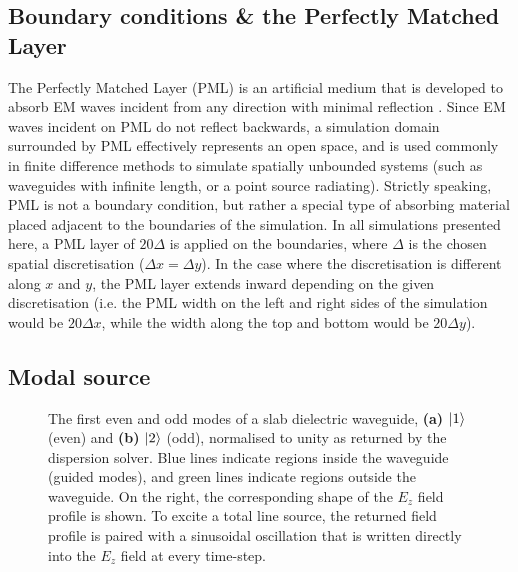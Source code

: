 \subsection{Boundary conditions \& the Perfectly Matched Layer}
The Perfectly Matched Layer (PML) is an artificial medium that is developed to absorb EM waves incident from any direction with minimal reflection \cite{Berenger1994}. Since EM waves incident on PML do not reflect backwards, a simulation domain surrounded by PML effectively represents an open space, and is used commonly in finite difference methods to simulate spatially unbounded systems (such as waveguides with infinite length, or a point source radiating). Strictly speaking, PML is not a boundary condition, but rather a special type of absorbing material placed adjacent to the boundaries of the simulation. In all simulations presented here, a PML layer of $20 \Delta$ is applied on the boundaries, where $\Delta$ is the chosen spatial discretisation ($\Delta x = \Delta y$). In the case where the discretisation is different along $x$ and $y$, the PML layer extends inward depending on the given discretisation (i.e. the PML width on the left and right sides of the simulation would be $20 \Delta x $, while the width along the top and bottom would be $20 \Delta y $).

\subsection{Modal source}

\begin{figure}[t]
	\centering
	\setlength{\figH}{0.5\textwidth}
	\setlength{\figW}{0.5\textwidth}
	\begin{subfigure}[t]{0.5\textwidth}
		
	\end{subfigure}%
	\begin{subfigure}[t]{0.5\textwidth}
		
	\end{subfigure}
	\caption[First two transverse electric modes of a slab dielectric waveguide]{The first even and odd modes of a slab dielectric waveguide, \textbf{(a)} $\ket{1}$ (even) and \textbf{(b)} $\ket{2}$ (odd), normalised to unity as returned by the dispersion solver. Blue lines indicate regions inside the waveguide (guided modes), and green lines indicate regions outside the waveguide. On the right, the corresponding shape of the $E_z$ field profile is shown. To excite a total line source, the returned field profile is paired with a sinusoidal oscillation that is written directly into the $E_z$ field at every time-step.}
	\label{fig:modes}
\end{figure}

